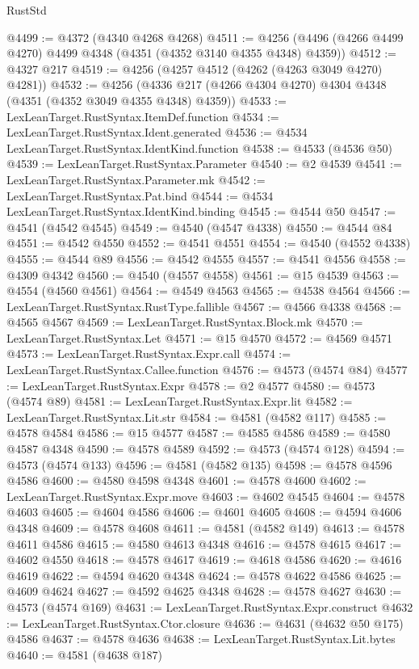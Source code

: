 \begin{lexlean}{RustStd}
\begin{coremodule}
@4499 := @4372 (@4340 @4268 @4268)
@4511 := @4256 (@4496 (@4266 @4499 @4270) @4499 @4348 (@4351 (@4352 @3140 @4355 @4348) @4359))
@4512 := @4327 @217
@4519 := @4256 (@4257 @4512 (@4262 (@4263 @3049 @4270) @4281))
@4532 := @4256 (@4336 @217 (@4266 @4304 @4270) @4304 @4348 (@4351 (@4352 @3049 @4355 @4348) @4359))
@4533 := LexLeanTarget.RustSyntax.ItemDef.function
@4534 := LexLeanTarget.RustSyntax.Ident.generated
@4536 := @4534 LexLeanTarget.RustSyntax.IdentKind.function
@4538 := @4533 (@4536 @50)
@4539 := LexLeanTarget.RustSyntax.Parameter
@4540 := @2 @4539
@4541 := LexLeanTarget.RustSyntax.Parameter.mk
@4542 := LexLeanTarget.RustSyntax.Pat.bind
@4544 := @4534 LexLeanTarget.RustSyntax.IdentKind.binding
@4545 := @4544 @50
@4547 := @4541 (@4542 @4545)
@4549 := @4540 (@4547 @4338)
@4550 := @4544 @84
@4551 := @4542 @4550
@4552 := @4541 @4551
@4554 := @4540 (@4552 @4338)
@4555 := @4544 @89
@4556 := @4542 @4555
@4557 := @4541 @4556
@4558 := @4309 @4342
@4560 := @4540 (@4557 @4558)
@4561 := @15 @4539
@4563 := @4554 (@4560 @4561)
@4564 := @4549 @4563
@4565 := @4538 @4564
@4566 := LexLeanTarget.RustSyntax.RustType.fallible
@4567 := @4566 @4338
@4568 := @4565 @4567
@4569 := LexLeanTarget.RustSyntax.Block.mk
@4570 := LexLeanTarget.RustSyntax.Let
@4571 := @15 @4570
@4572 := @4569 @4571
@4573 := LexLeanTarget.RustSyntax.Expr.call
@4574 := LexLeanTarget.RustSyntax.Callee.function
@4576 := @4573 (@4574 @84)
@4577 := LexLeanTarget.RustSyntax.Expr
@4578 := @2 @4577
@4580 := @4573 (@4574 @89)
@4581 := LexLeanTarget.RustSyntax.Expr.lit
@4582 := LexLeanTarget.RustSyntax.Lit.str
@4584 := @4581 (@4582 @117)
@4585 := @4578 @4584
@4586 := @15 @4577
@4587 := @4585 @4586
@4589 := @4580 @4587 @4348
@4590 := @4578 @4589
@4592 := @4573 (@4574 @128)
@4594 := @4573 (@4574 @133)
@4596 := @4581 (@4582 @135)
@4598 := @4578 @4596 @4586
@4600 := @4580 @4598 @4348
@4601 := @4578 @4600
@4602 := LexLeanTarget.RustSyntax.Expr.move
@4603 := @4602 @4545
@4604 := @4578 @4603
@4605 := @4604 @4586
@4606 := @4601 @4605
@4608 := @4594 @4606 @4348
@4609 := @4578 @4608
@4611 := @4581 (@4582 @149)
@4613 := @4578 @4611 @4586
@4615 := @4580 @4613 @4348
@4616 := @4578 @4615
@4617 := @4602 @4550
@4618 := @4578 @4617
@4619 := @4618 @4586
@4620 := @4616 @4619
@4622 := @4594 @4620 @4348
@4624 := @4578 @4622 @4586
@4625 := @4609 @4624
@4627 := @4592 @4625 @4348
@4628 := @4578 @4627
@4630 := @4573 (@4574 @169)
@4631 := LexLeanTarget.RustSyntax.Expr.construct
@4632 := LexLeanTarget.RustSyntax.Ctor.closure
@4636 := @4631 (@4632 @50 @175) @4586
@4637 := @4578 @4636
@4638 := LexLeanTarget.RustSyntax.Lit.bytes
@4640 := @4581 (@4638 @187)

\end{coremodule}
\end{lexlean}

